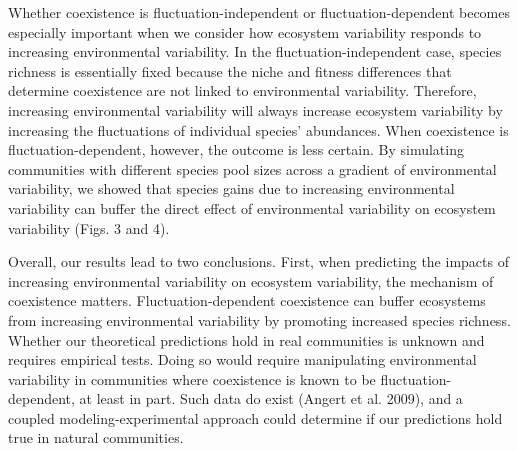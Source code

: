 \documentclass[12pt,]{article}
\begin{document}
Whether coexistence is fluctuation-independent or fluctuation-dependent
becomes especially important when we consider how ecosystem variability
responds to increasing environmental variability. In the
fluctuation-independent case, species richness is essentially fixed
because the niche and fitness differences that determine coexistence are
not linked to environmental variability. Therefore, increasing
environmental variability will always increase ecosystem variability by
increasing the fluctuations of individual species' abundances. When
coexistence is fluctuation-dependent, however, the outcome is less
certain. By simulating communities with different species pool sizes
across a gradient of environmental variability, we showed that species
gains due to increasing environmental variability can buffer the direct
effect of environmental variability on ecosystem variability (Figs. 3
and 4).


Overall, our results lead to two conclusions. First, when predicting the
impacts of increasing environmental variability on ecosystem
variability, the mechanism of coexistence matters. Fluctuation-dependent
coexistence can buffer ecosystems from increasing environmental
variability by promoting increased species richness. Whether our
theoretical predictions hold in real communities is unknown and requires
empirical tests. Doing so would require manipulating environmental
variability in communities where coexistence is known to be
fluctuation-dependent, at least in part. Such data do exist (Angert et
al. 2009), and a coupled modeling-experimental approach could determine
if our predictions hold true in natural communities.
\end{document}
